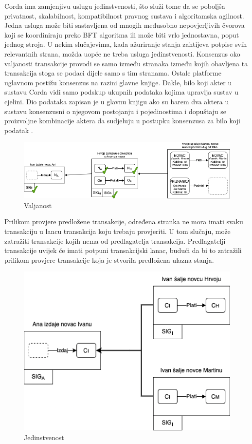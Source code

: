 \documentclass[times, utf8, diplomski]{fer}
\begin{document}
Corda ima zamjenjivu uslugu jedinstvenosti, što služi tome da se poboljša privatnost, skalabilnost, kompatibilnost pravnog sustava i algoritamska agilnost. Jedna usluga može biti sastavljena od mnogih međusobno nepovjerljivih čvorova koji se koordiniraju preko BFT algoritma ili može biti vrlo jednostavna, poput jednog stroja. U nekim slučajevima, kada ažuriranje stanja zahtijeva potpise svih relevantnih strana, možda uopće ne treba usluga jedinstvenosti. Konsenzus oko valjanosti transakcije provodi se samo između stranaka između kojih obavljena ta transakcija stoga se podaci dijele samo s tim stranama. Ostale platforme uglavnom postižu konsenzus na razini glavne knjige. Dakle, bilo koji akter u sustavu Corda vidi samo podskup ukupnih podataka kojima upravlja sustav u cjelini. Dio podataka zapisan je u glavnu knjigu ako su barem dva aktera u sustavu konsenzusni o njegovom postojanju i pojedinostima i dopuštaju se proizvoljne kombinacije aktera da sudjeluju u postupku konsenzusa za bilo koji podatak \cite{Corda}.

\begin{figure}[htb]
\centering
\includegraphics[width=12cm]{imgs/Validity consensus.png}
\caption{Valjanost}
\label{fig:validity}
\end{figure}

Prilikom provjere predložene transakcije, određena stranka ne mora imati svaku transakciju u lancu transakcija koju trebaju provjeriti. U tom slučaju,  može zatražiti transakcije kojih nema od predlagatelja transakcija. Predlagatelji transakcije uvijek će imati potpuni transakcijski lanac, budući da bi to zatražili prilikom provjere transakcije koja je stvorila predložena ulazna stanja.

\begin{figure}[htb]
\centering
\includegraphics[width=12cm]{imgs/Uniqueness consensus.png}
\caption{Jedinstvenost}
\label{fig:uniqueness}
\end{figure}
\end{document}
